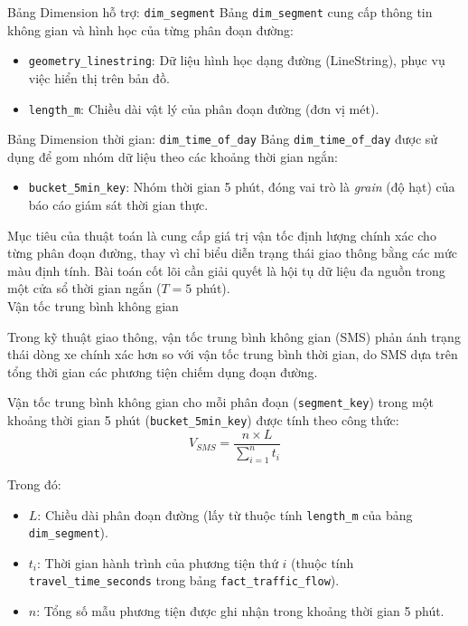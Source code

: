 Bảng Dimension hỗ trợ: \texttt{dim\_segment}
Bảng \texttt{dim\_segment} cung cấp thông tin không gian và hình học của từng phân đoạn đường:
\begin{itemize}
    \item \texttt{geometry\_linestring}: Dữ liệu hình học dạng đường (LineString), phục vụ việc hiển thị trên bản đồ.
    \item \texttt{length\_m}: Chiều dài vật lý của phân đoạn đường (đơn vị mét).
\end{itemize}

Bảng Dimension thời gian: \texttt{dim\_time\_of\_day}
Bảng \texttt{dim\_time\_of\_day} được sử dụng để gom nhóm dữ liệu theo các khoảng thời gian ngắn:
\begin{itemize}
    \item \texttt{bucket\_5min\_key}: Nhóm thời gian 5 phút, đóng vai trò là \textit{grain} (độ hạt) của báo cáo giám sát thời gian thực.
\end{itemize}


Mục tiêu của thuật toán là cung cấp giá trị vận tốc định lượng chính xác cho từng phân đoạn đường, thay vì chỉ biểu diễn trạng thái giao thông bằng các mức màu định tính. Bài toán cốt lõi cần giải quyết là hội tụ dữ liệu đa nguồn trong một cửa sổ thời gian ngắn ($T = 5$ phút).\\

Vận tốc trung bình không gian

Trong kỹ thuật giao thông, vận tốc trung bình không gian (SMS) phản ánh trạng thái dòng xe chính xác hơn so với vận tốc trung bình thời gian, do SMS dựa trên tổng thời gian các phương tiện chiếm dụng đoạn đường.

Vận tốc trung bình không gian cho mỗi phân đoạn (\texttt{segment\_key}) trong một khoảng thời gian 5 phút (\texttt{bucket\_5min\_key}) được tính theo công thức:
\[
V_{SMS} = \frac{n \times L}{\sum_{i=1}^{n} t_i}
\]

Trong đó:
\begin{itemize}
    \item $L$: Chiều dài phân đoạn đường (lấy từ thuộc tính \texttt{length\_m} của bảng \texttt{dim\_segment}).
    \item $t_i$: Thời gian hành trình của phương tiện thứ $i$ (thuộc tính \texttt{travel\_time\_seconds} trong bảng \texttt{fact\_traffic\_flow}).
    \item $n$: Tổng số mẫu phương tiện được ghi nhận trong khoảng thời gian 5 phút.
\end{itemize}

